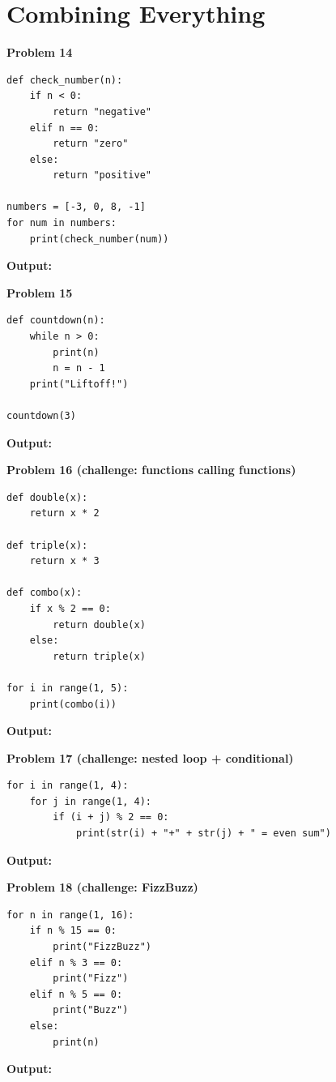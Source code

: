 \documentclass[11pt]{article}
\newcommand{\answerbox}{%
\vspace{2mm}
\noindent\textbf{Output:}
\vspace{14mm}
}
\begin{document}
\newpage
\section{Combining Everything}

\vspace{4mm}
\noindent\textbf{Problem 14}
\begin{lstlisting}
def check_number(n):
    if n < 0:
        return "negative"
    elif n == 0:
        return "zero"
    else:
        return "positive"

numbers = [-3, 0, 8, -1]
for num in numbers:
    print(check_number(num))
\end{lstlisting}
\answerbox

\vspace{4mm}
\noindent\textbf{Problem 15}
\begin{lstlisting}
def countdown(n):
    while n > 0:
        print(n)
        n = n - 1
    print("Liftoff!")

countdown(3)
\end{lstlisting}
\answerbox

\vspace{4mm}
\noindent\textbf{Problem 16 (challenge: functions calling functions)}
\begin{lstlisting}
def double(x):
    return x * 2

def triple(x):
    return x * 3

def combo(x):
    if x % 2 == 0:
        return double(x)
    else:
        return triple(x)

for i in range(1, 5):
    print(combo(i))
\end{lstlisting}
\answerbox

\vspace{4mm}
\noindent\textbf{Problem 17 (challenge: nested loop + conditional)}
\begin{lstlisting}
for i in range(1, 4):
    for j in range(1, 4):
        if (i + j) % 2 == 0:
            print(str(i) + "+" + str(j) + " = even sum")
\end{lstlisting}
\answerbox

\vspace{4mm}
\noindent\textbf{Problem 18 (challenge: FizzBuzz)}
\begin{lstlisting}
for n in range(1, 16):
    if n % 15 == 0:
        print("FizzBuzz")
    elif n % 3 == 0:
        print("Fizz")
    elif n % 5 == 0:
        print("Buzz")
    else:
        print(n)
\end{lstlisting}
\answerbox
\end{document}
